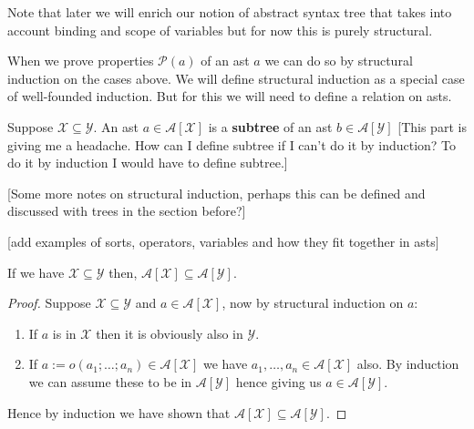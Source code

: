 \begin{remark}
    Note that later we will enrich our notion of abstract syntax tree that takes into account binding and scope of variables but for now this is purely structural.
\end{remark}

\begin{remark}
    When we prove properties $\mathcal{P}(a)$ of an ast $a$ we can do so by structural induction on the cases above. We will define structural induction as a special case of well-founded induction. But for this we will need to define a relation on asts.
\end{remark}

\begin{defin}
    Suppose $\mathcal{X} \subseteq \mathcal{Y}$. An ast $a \in \mathcal{A}[\mathcal{X}]$ is a \textbf{subtree} of an ast $b \in \mathcal{A}[\mathcal{Y}]$ [This part is giving me a headache. How can I define subtree if I can't do it by induction? To do it by induction I would have to define subtree.]
\end{defin}



[Some more notes on structural induction, perhaps this can be defined and discussed with trees in the section before?]

[add examples of sorts, operators, variables and how they fit together in asts]

\begin{lemma}
    If we have $\mathcal{X} \subseteq \mathcal{Y}$ then, $\mathcal{A}[\mathcal{X}] \subseteq \mathcal{A}[\mathcal{Y}]$.
\end{lemma}
\begin{proof}
    Suppose $\mathcal{X} \subseteq \mathcal{Y}$ and $a \in \mathcal{A}[\mathcal{X}]$, now by structural induction on $a$:
    
    \begin{enumerate}
        \item If $a$ is in $\mathcal{X}$ then it is obviously also in $\mathcal{Y}$.
        \item If $a := o(a_1;\dots;a_n) \in \mathcal{A}[\mathcal{X}]$ we have $a_1, \dots, a_n\in \mathcal{A}[\mathcal{X}]$ also. By induction we can assume these to be in $\mathcal{A}[\mathcal{Y}]$ hence giving us $a \in \mathcal{A}[\mathcal{Y}]$.
    \end{enumerate}
    
    Hence by induction we have shown that $\mathcal{A}[\mathcal{X}] \subseteq \mathcal{A}[\mathcal{Y}]$.
\end{proof}

